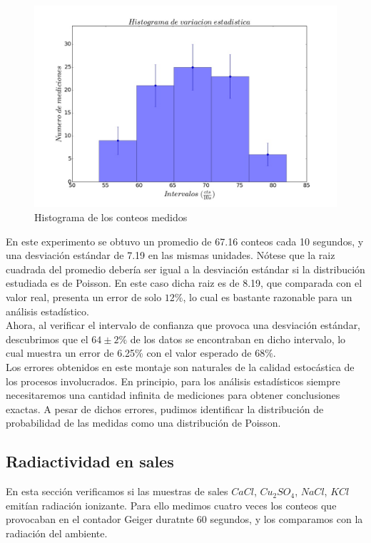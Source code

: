 \documentclass[%
 reprint,
 amsmath,amssymb,
 aps,
]{revtex4-1}
\begin{document}
\begin{figure}[h!]
\centering
\includegraphics[width=0.8\linewidth]{variacion.jpg}
\caption{Histograma de los conteos medidos}
\label{fig:variaciones}
\end{figure}

En este experimento se obtuvo un promedio de 67.16 conteos cada 10 segundos, y una desviación estándar de    7.19 en las mismas unidades. Nótese que la raiz cuadrada del promedio debería ser igual a la desviación estándar si la distribución estudiada es de Poisson. En este caso dicha raiz es de 8.19, que comparada con el valor real, presenta un error de solo $12\%$, lo cual es bastante razonable para un análisis estadístico.\\

Ahora, al verificar el intervalo de confianza que provoca una desviación estándar, descubrimos que el $64\pm2\%$ de los datos se encontraban en dicho intervalo, lo cual muestra un error de 6.25\% con el valor esperado de $68\%$.\\

Los errores obtenidos en este montaje son naturales de la calidad estocástica de los procesos involucrados. En principio, para los análisis estadísticos siempre necesitaremos una cantidad infinita de mediciones para obtener conclusiones exactas. A pesar de dichos errores, pudimos identificar la distribución de probabilidad de las medidas como una distribución de Poisson.\\

\subsection{\label{sec:level2}Radiactividad en sales} 
En esta sección verificamos si las muestras de sales $CaCl$, $Cu_2SO_4$, $NaCl$, $KCl$ emitían radiación ionizante. Para ello medimos cuatro veces los conteos que provocaban en el contador Geiger duratnte 60 segundos, y los comparamos con la radiación del ambiente.\\
\end{document}
